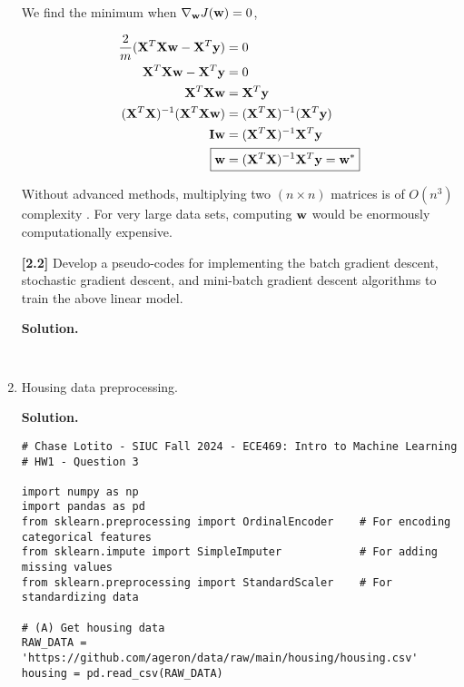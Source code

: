 \documentclass[11pt]{article}
\begin{document}
\begin{enumerate}[start=1,label={\bfseries Question \arabic*:},leftmargin=1in]
        We find the minimum when \(\nabla_{\vb{w}} J (\vb{w}) = 0\),

        \begin{align}
            \frac{2}{m} (\vb{X}^T\vb{X}\vb{w} - \vb{X}^T\vb{y} ) &= 0 \\
            \vb{X}^T\vb{X}\vb{w} - \vb{X}^T\vb{y} &= 0 \\
            \vb{X}^T\vb{X}\vb{w} &= \vb{X}^T\vb{y} \\
            (\vb{X}^T\vb{X})^{-1} ( \vb{X}^T\vb{X}\vb{w} ) &= (\vb{X}^T\vb{X})^{-1} ( \vb{X}^T\vb{y}) \\
            \vb{I}\vb{w} &= (\vb{X}^T\vb{X})^{-1} \vb{X}^T\vb{y} \\
            \Aboxed{\vb{w} &= (\vb{X}^T\vb{X})^{-1} \vb{X}^T\vb{y} = \vb{w}^*}
        \end{align}

        Without advanced methods, multiplying two \((n\times n)\) matrices is of \(O(n^3)\) complexity \cite{matrixcompute}. For very large data sets, computing \(\vb{w}\) would be enormously computationally expensive.
        
        \textbf{[2.2]} Develop a pseudo-codes for implementing the batch gradient descent, stochastic gradient descent, and mini-batch gradient descent algorithms to train the above linear model.

        \textbf{Solution.}

        \begin{lstlisting}
            
        \end{lstlisting}
        
        \item Housing data preprocessing.
        
        \textbf{Solution.}

        \begin{lstlisting}
# Chase Lotito - SIUC Fall 2024 - ECE469: Intro to Machine Learning
# HW1 - Question 3

import numpy as np
import pandas as pd
from sklearn.preprocessing import OrdinalEncoder    # For encoding categorical features
from sklearn.impute import SimpleImputer            # For adding missing values
from sklearn.preprocessing import StandardScaler    # For standardizing data

# (A) Get housing data
RAW_DATA = 'https://github.com/ageron/data/raw/main/housing/housing.csv'
housing = pd.read_csv(RAW_DATA)


\end{lstlisting}
\end{enumerate}
\end{document}
